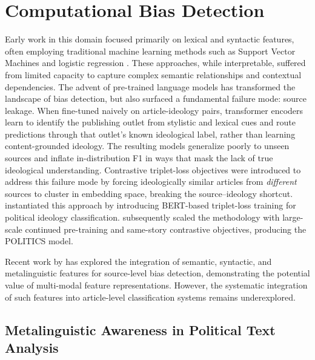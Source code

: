 \section{Computational Bias Detection}
\label{sec:rw-computational-bias-detection}

Early work in this domain focused primarily on lexical and syntactic features, often employing traditional machine learning methods such as Support Vector Machines and logistic regression \citep{recasens2013weasel}. These approaches, while interpretable, suffered from limited capacity to capture complex semantic relationships and contextual dependencies. The advent of pre-trained language models has transformed the landscape of bias detection, but also surfaced a fundamental failure mode: source leakage. When fine-tuned naively on article-ideology pairs, transformer encoders learn to identify the publishing outlet from stylistic and lexical cues and route predictions through that outlet's known ideological label, rather than learning content-grounded ideology. The resulting models generalize poorly to unseen sources and inflate in-distribution F1 in ways that mask the lack of true ideological understanding. Contrastive triplet-loss objectives were introduced to address this failure mode by forcing ideologically similar articles from \emph{different} sources to cluster in embedding space, breaking the source--ideology shortcut. \citet{baly2020we} instantiated this approach by introducing BERT-based triplet-loss training for political ideology classification. \citet{liu2022politics} subsequently scaled the methodology with large-scale continued pre-training and same-story contrastive objectives, producing the POLITICS model.

Recent work by \citet{ronnback2025biasoutlets} has explored the integration of semantic, syntactic, and metalinguistic features for source-level bias detection, demonstrating the potential value of multi-modal feature representations. However, the systematic integration of such features into article-level classification systems remains underexplored.

\subsection{Metalinguistic Awareness in Political Text Analysis}


